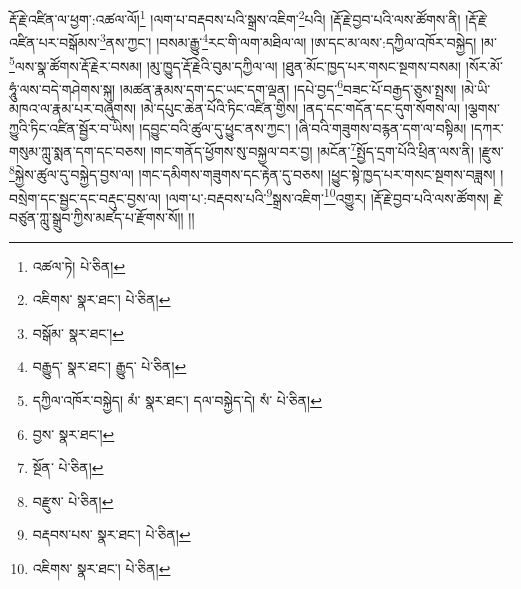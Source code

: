 \setcounter{footnote}{0} 
རྡོ་རྗེ་འཛིན་ལ་ཕྱག་:འཚལ་ལོ།\footnote{འཚལ་ཏེ།  པེ་ཅིན། } །ལག་པ་བརྡབས་པའི་སྒྲས་འཇིག་\footnote{འཇིགས་  སྣར་ཐང་།  པེ་ཅིན། }པའི། །རྡོ་རྗེ་བྱབ་པའི་ལས་ཚོགས་ནི། །རྡོ་རྗེ་འཛིན་པར་བསྒོམས་\footnote{བསྒོམ་  སྣར་ཐང་། }ནས་ཀྱང་། །བསམ་རྒྱུ་\footnote{བརྒྱུད་  སྣར་ཐང་། རྒྱུད་  པེ་ཅིན། }རང་གི་ལག་མཐིལ་ལ། །ཨ་དང་མ་ལས་:དཀྱིལ་འཁོར་བསྐྱེད། །མ་\footnote{དཀྱིལ་འཁོར་བསྐྱེད། མཾ་  སྣར་ཐང་། དལ་བསྐྱེད་དེ། སཾ་  པེ་ཅིན། }ལས་སྣ་ཚོགས་རྡོ་རྗེར་བསམ། །མུ་ཁྱུད་རྡོ་རྗེའི་བུམ་དཀྱིལ་ལ། །ཐུན་མོང་ཁྱད་པར་གསང་སྔགས་བསམ། །སོར་མོ་ཧཱུཾ་ལས་བདེ་གཤེགས་སྐུ། །མཚན་རྣམས་དག་དང་ཡང་དག་ལྡན། །དཔེ་བྱད་\footnote{བྱས་  སྣར་ཐང་། }བཟང་པོ་བརྒྱད་ཅུས་སྤྲས། །མེ་ཡི་མཁའ་ལ་རྣམ་པར་བཞུགས། །མེ་དཔུང་ཆེན་པོའི་ཏིང་འཛིན་གྱིས། །ནད་དང་གདོན་དང་དུག་སོགས་ལ། །ལྕགས་ཀྱུའི་ཏིང་འཛིན་སྦྱོར་བ་ཡིས། །དབྱུང་བའི་ཚུལ་དུ་ཕྱུང་ནས་ཀྱང་། །ཞི་བའི་གཟུགས་བརྙན་དག་ལ་བསྟིམ། །དཀར་གསུམ་ཀླུ་སྨན་དག་དང་བཅས། །གང་གནོད་ཕྱོགས་སུ་བསྐྱལ་བར་བྱ། །མངོན་\footnote{སྔོན་  པེ་ཅིན། }སྤྱོད་དྲག་པོའི་ཕྲིན་ལས་ནི། །རྫུས་\footnote{བརྫུས་  པེ་ཅིན། }སྐྱེས་ཚུལ་དུ་བསྐྱེད་བྱས་ལ། །གང་དམིགས་གཟུགས་དང་རྟེན་དུ་བཅས། །ཕྱུང་སྟེ་ཁྱད་པར་གསང་སྔགས་བཟླས། །བསྲེག་དང་སྦྱང་དང་བརྡུང་བྱས་ལ། །ལག་པ་:བརྡབས་པའི་\footnote{བརྡབས་པས་  སྣར་ཐང་།  པེ་ཅིན། }སྒྲས་འཇིག་\footnote{འཇིགས་  སྣར་ཐང་།  པེ་ཅིན། }འགྱུར། །རྡོ་རྗེ་བྱབ་པའི་ལས་ཚོགས། རྗེ་བཙུན་ཀླུ་སྒྲུབ་ཀྱིས་མཛད་པ་རྫོགས་སོ།། །།